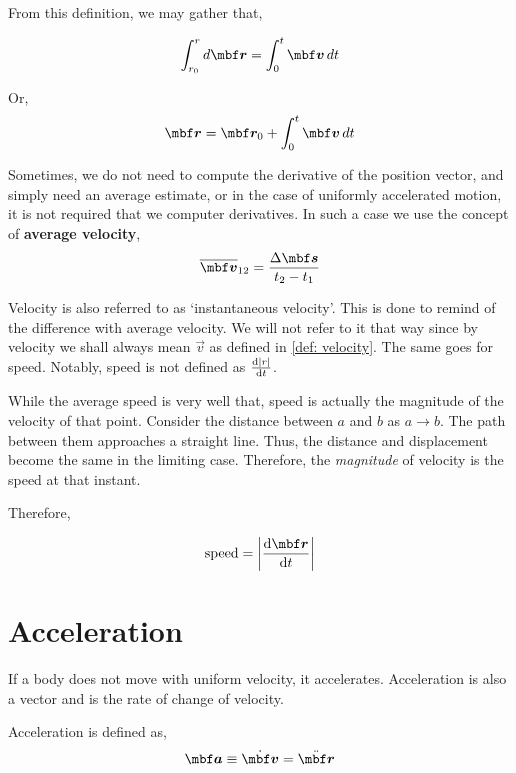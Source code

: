 From this definition, we may gather that,

\[\int_{r_0}^{r} \dd{\vec{r}} = \int_{0}^{t} \vv \dd{t}\]

Or, 
\begin{equation}
    \vec{r} = \vec{r}_0 + \int_{0}^{t} \vv \dd{t}
\end{equation}

Sometimes, we do not need to compute the derivative of the position vector, and simply need an average
estimate, or in the case of uniformly accelerated motion, it is not required that we computer derivatives.
In such a case we use the concept of \textbf{average velocity}, \[
    \bavg{\vec{v}}_{12} = \frac{\increment\vec{s}}{t_2 - t_1}  
\]


Velocity is also referred to as `instantaneous velocity'. This is done to remind of the difference
with average velocity. We will not refer to it that way since by velocity we shall always mean \(\vec{v}\) as defined in
\cref{def: velocity}. The same goes for speed. Notably, speed is not defined as \(\dv{\abs{r}}{t}\).

While the average speed is very well that, speed is actually the magnitude of the velocity of that point. 
Consider the distance between \(a\) and \(b\) as 
\(a \to b\). The path between them approaches a straight line. Thus, the distance and displacement become the same
in the limiting case. Therefore, the \emph{magnitude} of velocity is the speed at that instant.

Therefore, 

\[\text{speed} = \abs{\dv{\vec{r}}{t}}\]

\section{Acceleration}

If a body does not move with uniform velocity, it accelerates. Acceleration is also a vector and
is the rate of change of velocity.


\begin{definition}
    [Acceleration]
    \label{def: acceleration}
    Acceleration is defined as,
    \begin{equation}
        \vec{a} \equiv \ndiv{\vec{v}} = \nddiv{\vec{r}}    
    \end{equation}
\end{definition}

